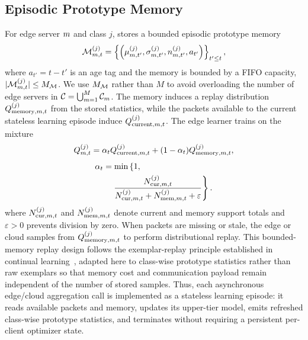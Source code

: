 \subsection{Episodic Prototype Memory}
For edge server $m$ and class $j$, \ehsfp stores a bounded episodic prototype memory
\begin{equation}
    \mathcal{M}_{m,t}^{(j)}
    =
    \left\{
    \left(\mu_{m,t'}^{(j)},\sigma_{m,t'}^{(j)},
    n_{m,t'}^{(j)},a_{t'}\right)
    \right\}_{t'\leq t},
\end{equation}
where $a_{t'}=t-t'$ is an age tag and the memory is bounded by a FIFO capacity, $|\mathcal{M}_{m,t}^{(j)}|\leq M_{\mathcal{M}}$. We use $M_{\mathcal{M}}$ rather than $M$ to avoid overloading the number of edge servers in $\mathcal{C}=\bigcup_{m=1}^{M}\mathcal{C}_{m}$. The memory induces a replay distribution $Q_{\mathrm{memory},m,t}^{(j)}$ from the stored statistics, while the packets available to the current stateless learning episode induce $Q_{\mathrm{current},m,t}^{(j)}$. The edge learner trains on the mixture
\begin{equation}
    Q_{m,t}^{(j)}
    =
    \alpha_t Q_{\mathrm{current},m,t}^{(j)}
    +
    (1-\alpha_t)Q_{\mathrm{memory},m,t}^{(j)},
    \label{eq:memory_mixture}
\end{equation}
\begin{equation*}
    \begin{split}
    \alpha_t
    &=
    \min\left\{
    1,
    \right.
    \\
    &\quad
    \left.
    \frac{N_{\mathrm{cur},m,t}^{(j)}}
    {N_{\mathrm{cur},m,t}^{(j)}
    +N_{\mathrm{mem},m,t}^{(j)}
    +\varepsilon}
    \right\}.
    \end{split}
\end{equation*}
where $N_{\mathrm{cur},m,t}^{(j)}$ and $N_{\mathrm{mem},m,t}^{(j)}$ denote current and memory support totals and $\varepsilon>0$ prevents division by zero. When packets are missing or stale, the edge or cloud samples from $Q_{\mathrm{memory},m,t}^{(j)}$ to perform distributional replay. This bounded-memory replay design follows the exemplar-replay principle established in continual learning~\cite{rebuffi2017icarl}, adapted here to class-wise prototype statistics rather than raw exemplars so that memory cost and communication payload remain independent of the number of stored samples. Thus, each asynchronous edge/cloud aggregation call is implemented as a stateless learning episode: it reads available packets and memory, updates its upper-tier model, emits refreshed class-wise prototype statistics, and terminates without requiring a persistent per-client optimizer state.

